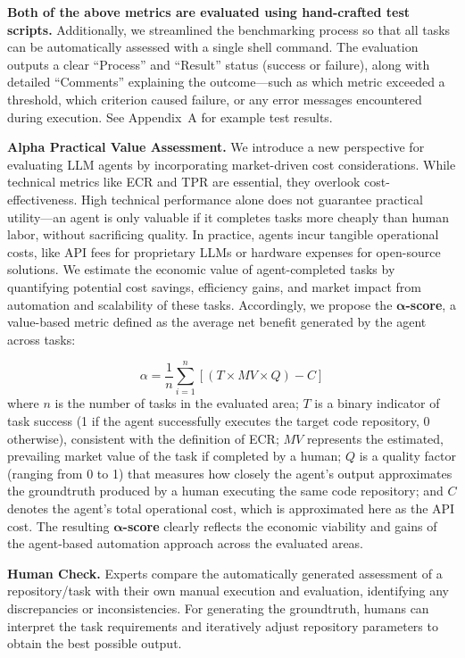 \documentclass[letterpaper]{article} %
\begin{document}
\textbf{Both of the above metrics are evaluated using hand-crafted test scripts.} Additionally, we streamlined the benchmarking process so that all tasks can be automatically assessed with a single shell command. The evaluation outputs a clear “Process” and “Result” status (success or failure), along with detailed “Comments” explaining the outcome—such as which metric exceeded a threshold, which criterion caused failure, or any error messages encountered during execution.
See Appendix~A for example test results.

 
\textbf{Alpha Practical Value Assessment.} We introduce a new perspective for evaluating LLM agents by incorporating market-driven cost considerations. While technical metrics like ECR and TPR are essential, they overlook cost-effectiveness. High technical performance alone does not guarantee practical utility—an agent is only valuable if it completes tasks more cheaply than human labor, without sacrificing quality. In practice, agents incur tangible operational costs, like API fees for proprietary LLMs or hardware expenses for open-source solutions. 
%
We estimate the economic value of agent-completed tasks by quantifying potential cost savings, efficiency gains, and market impact from automation and scalability of these tasks. 
Accordingly, we propose the \textbf{\(\boldsymbol{\alpha}\)-score}, a value-based metric defined as the average net benefit generated by the agent across tasks:

\begin{equation}
\alpha=\frac{1}{n} \sum_{i=1}^{n} \left [(T\times MV\times Q)- C \right ] 
\end{equation}
where $n$ is the number of tasks in the evaluated area; $T$ is a binary indicator of task success (1 if the agent successfully executes the target code repository, 0 otherwise), consistent with the definition of ECR; $MV$ represents the estimated, prevailing market value of the task if completed by a human; $Q$ is a quality factor (ranging from 0 to 1) that measures how closely the agent’s output approximates the groundtruth produced by a human executing the same code repository; and $C$ denotes the agent’s total operational cost, which is approximated here as the API cost. The resulting \textbf{\(\boldsymbol{\alpha}\)-score} clearly reflects the economic viability and gains of the agent-based automation approach across the evaluated areas.


\textbf{Human Check.} 
Experts compare the automatically generated assessment of a repository/task with their own manual execution and evaluation, identifying any discrepancies or inconsistencies. For generating the groundtruth, humans can interpret the task requirements and iteratively adjust repository parameters to obtain the best possible output. 
\end{document}
